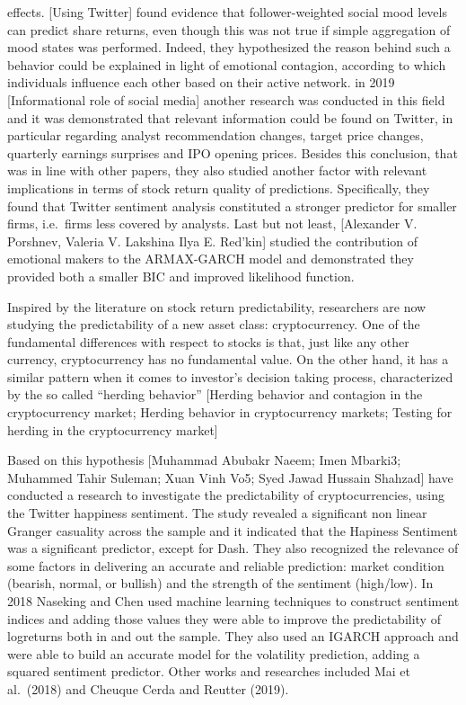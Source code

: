 \documentclass[
]{article}
\begin{document}
effects. {[}Using Twitter{]} found evidence that follower-weighted
social mood levels can predict share returns, even though this was not
true if simple aggregation of mood states was performed. Indeed, they
hypothesized the reason behind such a behavior could be explained in
light of emotional contagion, according to which individuals influence
each other based on their active network. in 2019 {[}Informational role
of social media{]} another research was conducted in this field and it
was demonstrated that relevant information could be found on Twitter, in
particular regarding analyst recommendation changes, target price
changes, quarterly earnings surprises and IPO opening prices. Besides
this conclusion, that was in line with other papers, they also studied
another factor with relevant implications in terms of stock return
quality of predictions. Specifically, they found that Twitter sentiment
analysis constituted a stronger predictor for smaller firms, i.e.~firms
less covered by analysts. Last but not least, {[}Alexander V. Porshnev,
Valeria V. Lakshina Ilya E. Red'kin{]} studied the contribution of
emotional makers to the ARMAX-GARCH model and demonstrated they provided
both a smaller BIC and improved likelihood function.

Inspired by the literature on stock return predictability, researchers
are now studying the predictability of a new asset class:
cryptocurrency. One of the fundamental differences with respect to
stocks is that, just like any other currency, cryptocurrency has no
fundamental value. On the other hand, it has a similar pattern when it
comes to investor's decision taking process, characterized by the so
called ``herding behavior'' {[}Herding behavior and contagion in the
cryptocurrency market; Herding behavior in cryptocurrency markets;
Testing for herding in the cryptocurrency market{]}

Based on this hypothesis {[}Muhammad Abubakr Naeem; Imen Mbarki3;
Muhammed Tahir Suleman; Xuan Vinh Vo5; Syed Jawad Hussain Shahzad{]}
have conducted a research to investigate the predictability of
cryptocurrencies, using the Twitter happiness sentiment. The study
revealed a significant non linear Granger casuality across the sample
and it indicated that the Hapiness Sentiment was a significant
predictor, except for Dash. They also recognized the relevance of some
factors in delivering an accurate and reliable prediction: market
condition (bearish, normal, or bullish) and the strength of the
sentiment (high/low). In 2018 Naseking and Chen used machine learning
techniques to construct sentiment indices and adding those values they
were able to improve the predictability of logreturns both in and out
the sample. They also used an IGARCH approach and were able to build an
accurate model for the volatility prediction, adding a squared sentiment
predictor. Other works and researches included Mai et al.~(2018) and
Cheuque Cerda and Reutter (2019).
\end{document}
